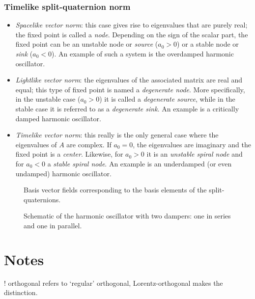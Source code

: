 \subsubsection*{Timelike split-quaternion norm}
    \begin{itemize}
        \item[\circled{4}] \emph{Spacelike vector norm}: this case gives rise to eigenvalues that are purely real; the fixed point is called a \emph{node}. Depending on the sign of the scalar part, the fixed point can be an unstable node or \emph{source} ($a_0 > 0$) or a stable node or \emph{sink} ($a_0 < 0$). An example of such a system is the overdamped harmonic oscillator.
        \item[\circled{5}] \emph{Lightlike vector norm}: the eigenvalues of the associated matrix are real and equal; this type of fixed point is named a \emph{degenerate node}. More specifically, in the unstable case ($a_0 > 0$) it is called a \emph{degenerate source}, while in the stable case it is referred to as a \emph{degenerate sink}. An example is a critically damped harmonic oscillator.
        \item[\circled{6}] \emph{Timelike vector norm}: this really is the only general case where the eigenvalues of $A$ are complex. If $a_0 = 0$, the eigenvalues are imaginary and the fixed point is a \emph{center}. Likewise, for $a_0 > 0$ it is an \emph{unstable spiral node} and for $a_0 < 0$ a \emph{stable spiral node}. An example is an underdamped (or even undamped) harmonic oscillator.
    \end{itemize}



\begin{figure}
    \centering
    
    \caption{Basis vector fields corresponding to the basis elements of the split-quaternions.}
    \label{fig:basis_vf}
\end{figure}

\begin{figure}
    \centering
    
    \caption{Schematic of the harmonic oscillator with two dampers: one in series and one in parallel.}
    \label{fig:double_damped_osc}
\end{figure}

\section{Notes}
! orthogonal refers to `regular' orthogonal, Lorentz-orthogonal makes the distinction.

